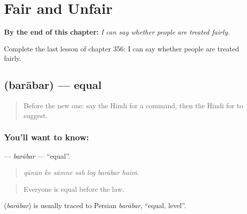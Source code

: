 
\chapter{Fair and Unfair}
\label{ch:hi-fair-and-unfair}

\begin{chapteropening}
\textbf{By the end of this chapter:} \emph{I can say whether people are treated fairly.}

Complete the last lesson of chapter 356: I can say whether people are treated fairly.
\end{chapteropening}

\section[\texorpdfstring{\hi{बराबर} (barābar)}{बराबर (barābar)}]{ (barābar) — equal}

\label{lesson:HI-C356-barabar}



\begin{quote}
Before the new one: say the Hindi for a command, then the Hindi for to suggest.
\end{quote}

\subsection*{You'll want to know: }
\textbf{} — \emph{barābar} — \textquotedblleft{}equal\textquotedblright{}.

\begin{quote}
      
\end{quote}

\begin{quote}
\emph{qānūn ke sāmne sab log barābar haiṁ.}
\end{quote}

\begin{quote}
Everyone is equal before the law.
\end{quote}

\begin{cousinweb}
\textbf{} (\emph{barābar}) is usually traced to Persian \emph{barābar}, \textquotedblleft{}equal, level\textquotedblright{}.
\end{cousinweb}

